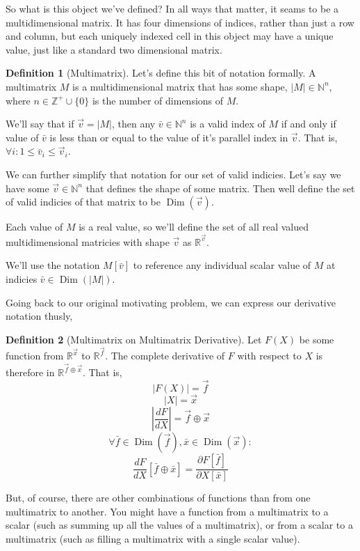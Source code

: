 \documentclass[12pt]{article}
\theoremstyle{definition}
\newtheorem{definition}{Definition}[section]
\theoremstyle{plain}
\theoremstyle{ppart}
\DeclareMathOperator{\Dim}{Dim}
\begin{document}
So what is this object we've defined? In all ways that matter, it seams to be
a multidimensional matrix. It has four dimensions of indices, rather than just
a row and column, but each uniquely indexed cell in this object may have a
unique value, just like a standard two dimensional matrix.

\begin{definition}[Multimatrix]
Let's define this bit of notation formally. A multimatrix $M$ is a multidimensional
matrix that has some shape, $|M| \in \mathbb{N}^n$, where $n \in \mathbb{Z}^+ \cup \{0\}$
is the number of dimensions of $M$.

We'll say that if $\vec{v} = |M|$, then any $\bar{v} \in \mathbb{N}^n$ is a valid
index of $M$ if and only if value of $\bar{v}$ is less than or equal to the value
of it's parallel index in $\vec{v}$. That is, $\forall i: 1 \le \bar{v}_i \le \vec{v}_i$.

We can further simplify that notation for our set of valid indicies. Let's say we have
some $\vec{v} \in \mathbb{N}^n$ that defines the shape of some matrix. Then well
define the set of valid indicies of that matrix to be $\Dim(\vec{v})$. 

Each value of $M$ is a real value, so we'll define the set of all real valued
multidimensional matricies with shape $\vec{v}$ as $\mathbb{R}^{\vec{v}}$.

We'll use the notation $M[\bar{v}]$ to reference any individual scalar value of $M$
at indicies $\bar{v} \in \Dim(|M|)$. 
\end{definition}

Going back to our original motivating problem, we can express our derivative
notation thusly,

\begin{definition}[Multimatrix on Multimatrix Derivative]
\label{mm_derivative}
Let $F(X)$ be some function from $\mathbb{R}^{\vec{x}}$ to $\mathbb{R}^{\vec{f}}$.
The complete derivative of $F$ with respect to $X$ is therefore in
$\mathbb{R}^{\vec{f} \oplus \vec{x}}$. That is,
\[ |F(X)| = \vec{f} \]
\[ |X| = \vec{x} \]
\[ \left|\frac{dF}{dX}\right| = \vec{f} \oplus \vec{x} \]
\[
\forall \bar{f} \in \Dim(\vec{f}),
        \bar{x} \in \Dim(\vec{x}):
\]
\[
\frac{dF}{dX}[\bar{f} \oplus \bar{x}] =
\frac{\partial F[\bar{f}]}{\partial X[\bar{x}]}
\]
\end{definition}

But, of course, there are other combinations of functions than from one
multimatrix to another. You might have a function from a multimatrix to a
scalar (such as summing up all the values of a multimatrix), or from a scalar
to a multimatrix (such as filling a multimatrix with a single scalar value).
\end{document}
